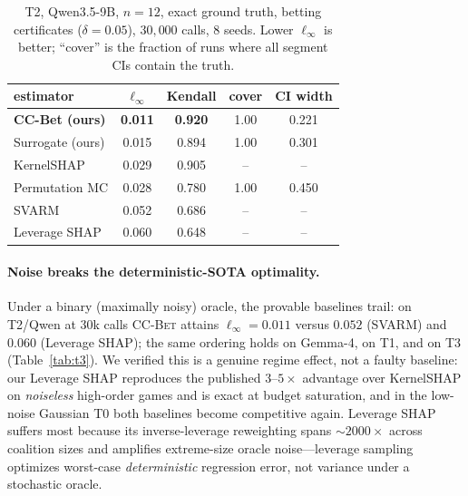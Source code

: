 \documentclass[10pt,twocolumn,letterpaper]{article}
\theoremstyle{plain}
\theoremstyle{definition}
\begin{document}
\begin{table}[t]
\centering\small
\caption{T2, Qwen3.5-9B, $n{=}12$, exact ground truth, betting certificates
($\delta{=}0.05$), $30{,}000$ calls, 8 seeds. Lower $\ell_\infty$ is better;
``cover'' is the fraction of runs where all segment CIs contain the truth.}
\label{tab:t2}
\begin{tabular}{lcccc}
\toprule
estimator & $\ell_\infty$ & Kendall & cover & CI width \\
\midrule
\textbf{CC-Bet (ours)} & \textbf{0.011} & \textbf{0.920} & 1.00 & 0.221 \\
Surrogate (ours)       & 0.015 & 0.894 & 1.00 & 0.301 \\
KernelSHAP             & 0.029 & 0.905 & --   & --    \\
Permutation MC         & 0.028 & 0.780 & 1.00 & 0.450 \\
SVARM                  & 0.052 & 0.686 & --   & --    \\
Leverage SHAP          & 0.060 & 0.648 & --   & --    \\
\bottomrule
\end{tabular}
\end{table}

\paragraph{Noise breaks the deterministic-SOTA optimality.} Under a binary
(maximally noisy) oracle, the provable baselines trail: on T2/Qwen at $30$k calls
\textsc{CC-Bet} attains $\ell_\infty=0.011$ versus $0.052$ (SVARM) and $0.060$
(Leverage SHAP); the same ordering holds on Gemma-4, on T1, and on T3
(Table~\ref{tab:t3}). We verified this is a genuine regime effect, not a faulty
baseline: our Leverage SHAP reproduces the published $3$--$5\times$ advantage
over KernelSHAP on \emph{noiseless} high-order games and is exact at budget
saturation, and in the low-noise Gaussian T0 both baselines become competitive
again. Leverage SHAP suffers most because its inverse-leverage reweighting spans
$\sim\!2000\times$ across coalition sizes and amplifies extreme-size oracle
noise---leverage sampling optimizes worst-case \emph{deterministic} regression
error, not variance under a stochastic oracle.
\end{document}
